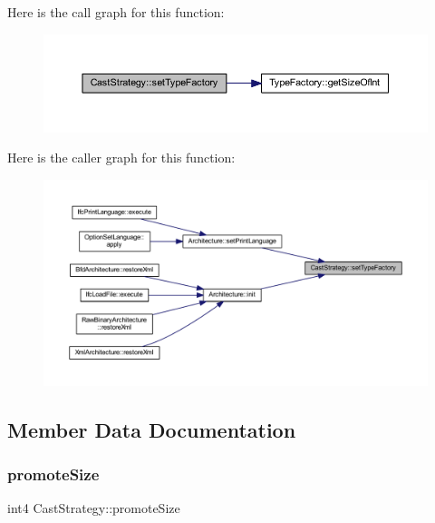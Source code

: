 Here is the call graph for this function\+:
\nopagebreak
\begin{figure}[H]
\begin{center}
\leavevmode
\includegraphics[width=350pt]{class_cast_strategy_ae2b05a7a9e2087e7de589a8c4fb2c74a_cgraph}
\end{center}
\end{figure}
Here is the caller graph for this function\+:
\nopagebreak
\begin{figure}[H]
\begin{center}
\leavevmode
\includegraphics[width=350pt]{class_cast_strategy_ae2b05a7a9e2087e7de589a8c4fb2c74a_icgraph}
\end{center}
\end{figure}


\subsection{Member Data Documentation}
\mbox{\label{class_cast_strategy_a0a8f84d834efacc20926b6712865e9e1}} 
\subsubsection{\texorpdfstring{promoteSize}{promoteSize}}
{\footnotesize\ttfamily int4 Cast\+Strategy\+::promote\+Size\hspace{0.3cm}{\ttfamily [protected]}}



